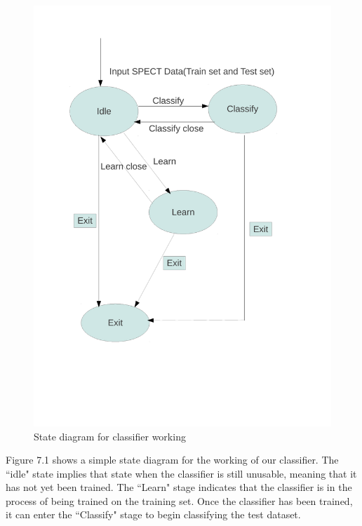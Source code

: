 \documentclass[11pt,a4paper]{report}
\begin{document}
{\vspace{-3cm}
\begin{figure}[H]
\begin{center}
\includegraphics[width=13cm]{1.pdf}
\captionsetup{width=13cm}
\vspace{-4cm}
\caption{State diagram for classifier working}
\end{center}
\end{figure}

Figure 7.1 shows a simple state diagram for the working of our classifier. The ``idle" state implies that state when the classifier is still unusable, meaning that it has not yet been trained. The ``Learn" stage indicates that the classifier is in the process of being trained on the training set. Once the classifier has been trained, it can enter the ``Classify" stage to begin classifying the test dataset.\\

}
\end{document}
